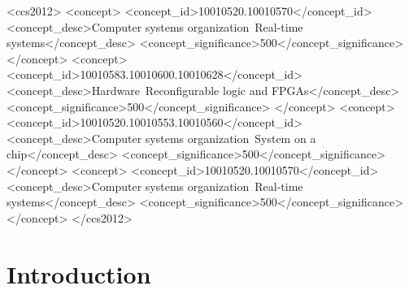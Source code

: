 \documentclass[sigconf]{acmart}
\newcommand{\hlsfml}{\texttt{hls4ml}\xspace}
\begin{document}
\begin{CCSXML}
<ccs2012>
<concept>
<concept_id>10010520.10010570</concept_id>
<concept_desc>Computer systems organization~Real-time systems</concept_desc>
<concept_significance>500</concept_significance>
</concept>
<concept>
<concept_id>10010583.10010600.10010628</concept_id>
<concept_desc>Hardware~Reconfigurable logic and FPGAs</concept_desc>
<concept_significance>500</concept_significance>
</concept>
<concept>
<concept_id>10010520.10010553.10010560</concept_id>
<concept_desc>Computer systems organization~System on a chip</concept_desc>
<concept_significance>500</concept_significance>
</concept>
<concept>
<concept_id>10010520.10010570</concept_id>
<concept_desc>Computer systems organization~Real-time systems</concept_desc>
<concept_significance>500</concept_significance>
</concept>
</ccs2012>
\end{CCSXML}




\maketitle


\section{Introduction}
\end{document}
